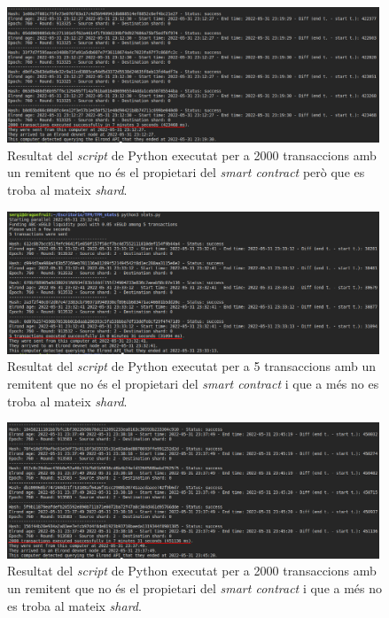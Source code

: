 \documentclass[11pt,a4paper]{article}
\begin{document}
\begin{figure}[h]
\includegraphics[width=0.99\textwidth]{send2000transnotowner.png}
\centering
\caption{Resultat del \textit{script} de Python executat per a 2000 transaccions amb un remitent que no és el propietari del \textit{smart contract} però que es troba al mateix \textit{shard}.}\label{fig:send2000transnotowner}
\end{figure} 

\begin{figure}[h]
\includegraphics[width=0.99\textwidth]{send5transnotownerothershards.png}
\centering
\caption{Resultat del \textit{script} de Python executat per a 5 transaccions amb un remitent que no és el propietari del \textit{smart contract} i que a més no es troba al mateix \textit{shard}.}\label{fig:send5transnotownerothershards}
\end{figure} 

\begin{figure}[h]
\includegraphics[width=0.99\textwidth]{send2000transnotownerothershards.png}
\centering
\caption{Resultat del \textit{script} de Python executat per a 2000 transaccions amb un remitent que no és el propietari del \textit{smart contract} i que a més no es troba al mateix \textit{shard}.}\label{fig:send2000transnotownerothershards}
\end{figure} 
\end{document}
